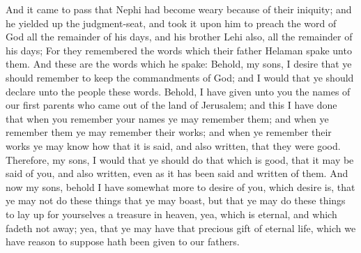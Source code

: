 And it came to pass that Nephi had become weary because of their iniquity; and he yielded up the judgment-seat, and took it upon him to preach the word of God all the remainder of his days, and his brother Lehi also, all the remainder of his days;
\bverse \iffalse For they remembered the words which their father Helaman spake unto them. And these are the words which he spake: \fi
For they remembered the words which their father Helaman spake unto them. And these are the words which he spake:
\bverse \iffalse Behold, my sons, I desire that ye should remember to keep the commandments of God; and I would that ye should declare unto the people these words. Behold, I have given unto you the names of our first parents who came out of the land of Jerusalem; and this I have done that when you remember your names ye may remember them; and when ye remember them ye may remember their works; and when ye remember their works ye may know how that it is said, and also written, that they were good. \fi
Behold, my sons, I desire that ye should remember to keep the commandments of God; and I would that ye should declare unto the people these words. Behold, I have given unto you the names of our first parents who came out of the land of Jerusalem; and this I have done that when you remember your names ye may remember them; and when ye remember them ye may remember their works; and when ye remember their works ye may know how that it is said, and also written, that they were good.
\bverse \iffalse Therefore, my sons, I would that ye should do that which is good, that it may be said of you, and also written, even as it has been said and written of them. \fi
Therefore, my sons, I would that ye should do that which is good, that it may be said of you, and also written, even as it has been said and written of them.
\bverse \iffalse And now my sons, behold I have somewhat more to desire of you, which desire is, that ye may not do these things that ye may boast, but that ye may do these things to lay up for yourselves a treasure in heaven, yea, which is eternal, and which fadeth not away; yea, that ye may have that precious gift of eternal life, which we have reason to suppose hath been given to our fathers. \fi
And now my sons, behold I have somewhat more to desire of you, which desire is, that ye may not do these things that ye may boast, but that ye may do these things to lay up for yourselves a treasure in heaven, yea, which is eternal, and which fadeth not away; yea, that ye may have that precious gift of eternal life, which we have reason to suppose hath been given to our fathers.
